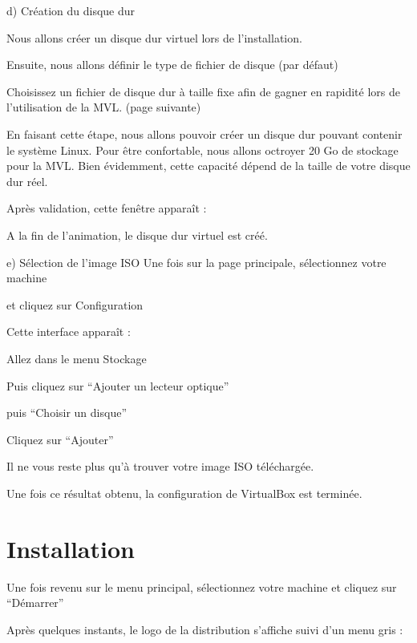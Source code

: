     d) Création du disque dur

Nous allons créer un disque dur virtuel lors de l’installation.

Ensuite, nous allons définir le type de fichier de disque (par défaut)



Choisissez un fichier de disque dur à taille fixe afin de gagner en rapidité lors de l’utilisation de la MVL. (page suivante)





En faisant cette étape, nous allons pouvoir créer un disque dur pouvant contenir le système Linux. Pour être confortable, nous allons octroyer 20 Go de stockage pour la MVL.
Bien évidemment, cette capacité dépend de la taille de votre disque dur réel.

Après validation, cette fenêtre apparaît :


A la fin de l’animation, le disque dur virtuel est créé.





    e) Sélection de l’image ISO
Une fois sur la page principale, sélectionnez votre machine 

et cliquez sur Configuration


Cette interface apparaît :


Allez dans le menu Stockage


Puis cliquez sur “Ajouter un lecteur optique”


puis “Choisir un disque”

Cliquez sur “Ajouter”


Il ne vous reste plus qu'à trouver votre image ISO téléchargée.








Une fois ce résultat obtenu, la configuration de VirtualBox est terminée.



\section{Installation}


Une fois revenu sur le menu principal, sélectionnez votre machine et cliquez sur “Démarrer”


Après quelques instants, le logo de la distribution s’affiche suivi d’un menu gris :




